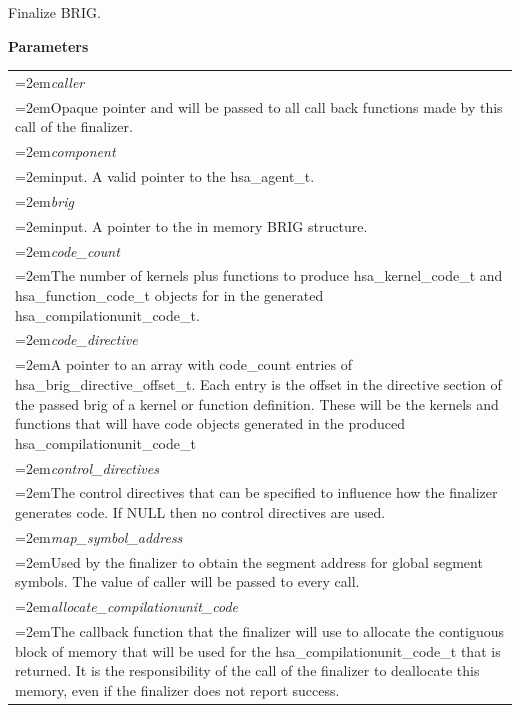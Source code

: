 \documentclass{book}
\newcommand{\hsaarg}[1]{\textit{#1}}
\begin{document}
\begin{appendices}
\begin{tcolorbox}[breakable,nobeforeafter,colframe=white,colback=lightgray,left=0mm]
\end{tcolorbox}
Finalize BRIG.

\noindent\textbf{Parameters}\\[-6mm]
\noindent\begin{longtable}{@{}>{\hangindent=2em}p{\textwidth}}
\hsaarg{caller}\\\hspace{2em}Opaque pointer and will be passed to all call back functions made by this call of the finalizer.\\[2mm]
\hsaarg{component}\\\hspace{2em}input. A valid pointer to the hsa\_agent\_t.\\[2mm]
\hsaarg{brig}\\\hspace{2em}input. A pointer to the in memory BRIG structure.\\[2mm]
\hsaarg{code\_count}\\\hspace{2em}The number of kernels plus functions to produce hsa\_kernel\_code\_t and hsa\_function\_code\_t objects for in the generated hsa\_compilationunit\_code\_t.\\[2mm]
\hsaarg{code\_directive}\\\hspace{2em}A pointer to an array with code\_count entries of hsa\_brig\_directive\_offset\_t. Each entry is the offset in the directive section of the passed brig of a kernel or function definition. These will be the kernels and functions that will have code objects generated in the produced hsa\_compilationunit\_code\_t\\[2mm]
\hsaarg{control\_directives}\\\hspace{2em}The control directives that can be specified to influence how the finalizer generates code. If NULL then no control directives are used.\\[2mm]
\hsaarg{map\_symbol\_address}\\\hspace{2em}Used by the finalizer to obtain the segment address for global segment symbols. The value of caller will be passed to every call.\\[2mm]
\hsaarg{allocate\_compilationunit\_code}\\\hspace{2em}The callback function that the finalizer will use to allocate the contiguous block of memory that will be used for the hsa\_compilationunit\_code\_t that is returned. It is the responsibility of the call of the finalizer to deallocate this memory, even if the finalizer does not report success.\\[2mm]

\end{longtable}
\end{appendices}
\end{document}
